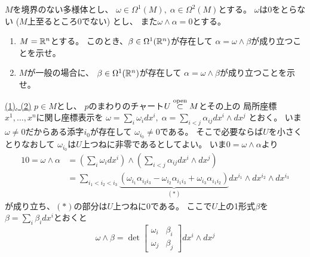 \documentclass[report, notitlepage]{jlreq}
\begin{document}
\begin{problem}[問1]
    $M$を境界のない多様体とし、
    $\omega \in \Omega^1(M), \; \alpha \in \Omega^2(M)$とする。
    $\omega$は$0$をとらない ($M$上至るところ$0$でない) とし、
    また$\omega \wedge \alpha = 0$とする。
    \begin{enumerate}
        \item $M = \mathbb{R}^n$とする。
            このとき、$\beta \in \Omega^1(\mathbb{R}^n)$が存在して
            $\alpha = \omega \wedge \beta$が成り立つことを示せ。
        \item $M$が一般の場合に、
            $\beta \in \Omega^1(\mathbb{R}^n)$が存在して
            $\alpha = \omega \wedge \beta$が成り立つことを示せ。
    \end{enumerate}
\end{problem}

\begin{answer}
    \uline{(1), (2)} \quad
    $p \in M$とし、
    $p$のまわりのチャート$U \stackrel{\text{open}}{\subset} M$とその上の
    局所座標$x^1, \dots, x^n$に関し座標表示を
    $\omega = \sum_i \omega_i dx^i, \;
        \alpha = \sum_{i < j} \alpha_{ij} dx^i \wedge dx^j$
    とおく。
    いま$\omega \neq 0$だからある添字$i_0$が存在して
    $\omega_{i_0} \neq 0$である。
    そこで必要ならば$U$を小さくとりなおして
    $\omega_{i_0}$は$U$上つねに非零であるとしてよい。
    いま$0 = \omega \wedge \alpha$より
    \begin{alignat}{1}
        0 = \omega \wedge \alpha
            &= \left(
                \sum_{i} \omega_i dx^i
            \right)
            \wedge \left(
                \sum_{i < j} \alpha_{ij} dx^i \wedge dx^j
            \right) \\
            &= \sum_{i_1 < i_2 < i_3}
                \underbrace{\left(
                    \omega_{i_1} \alpha_{i_2 i_3}
                    - \omega_{i_2} \alpha_{i_1 i_3}
                    + \omega_{i_3} \alpha_{i_1 i_2}
                \right)}_{(*)}
                dx^{i_1} \wedge dx^{i_2} \wedge dx^{i_3}
    \end{alignat}
    が成り立ち、$(*)$の部分は$U$上つねに0である。
    ここで$U$上の1形式$\beta$を
    $\beta = \sum_{i} \beta_i dx^i$とおくと
    \begin{equation}
        \omega \wedge \beta
            = \det \begin{bmatrix}
                \omega_i & \beta_i \\
                \omega_j & \beta_j
            \end{bmatrix}
            dx^i \wedge dx^j
    \end{equation}

\end{answer}
\end{document}
